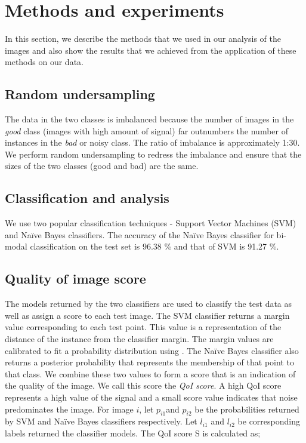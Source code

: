 \section{Methods and experiments}
In this section, we describe the methods that we used in our analysis of the images and also show the results that we achieved from the application of these methods on our data.

\subsection{Random undersampling}
The data in the two classes is imbalanced because the number of images in the \textit{good} class (images with high amount of signal) far outnumbers the number of instances in the \textit{bad} or noisy class. The ratio of imbalance is approximately 1:30. We perform random undersampling to redress the imbalance and ensure that the sizes of the two classes (good and bad) are the same.

\subsection{Classification and analysis}
We use two popular classification techniques - Support Vector Machines (SVM) and Naïve Bayes classifiers. The accuracy of the Naïve Bayes classifier for bi-modal classification on the test set is 96.38 \% and that of SVM is 91.27 \%.

\subsection{Quality of image score}
The models returned by the two classifiers are used to classify the test data as well as assign a score to each test image. The SVM classifier returns a margin value corresponding to each test point. This value is a representation of the distance of the instance from the classifier margin. The margin values are calibrated to fit a probability distribution using \cite{platt1999probabilistic}. The Naïve Bayes classifier also returns a posterior probability that represents the membership of that point to that class. We combine these two values to form a score that is an indication of the quality of the image. We call this score the \textit{QoI score}. A high QoI score represents a high value of the signal and a small score value indicates that noise predominates the image. 
For image $i$, let $p_{i1}$and $p_{i2}$ be the probabilities returned by SVM and Naïve Bayes classifiers respectively. Let $l_{i1}$ and $l_{i2}$ be corresponding labels returned the classifier models. The QoI score S is calculated as;

